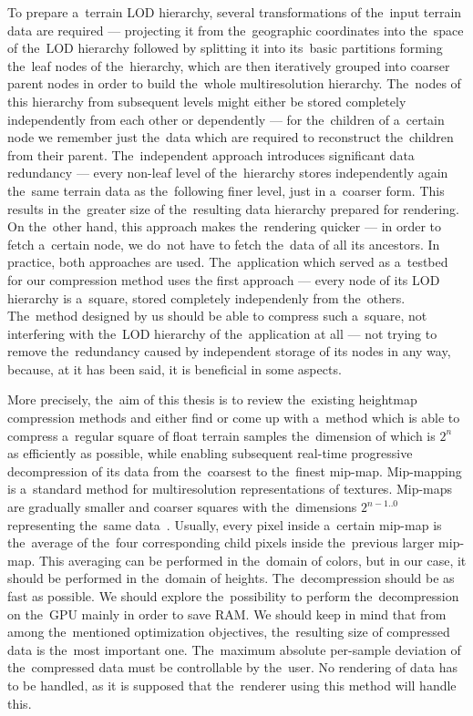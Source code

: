 To prepare a~terrain LOD hierarchy, several transformations of the~input terrain data are required --- projecting it from the~geographic coordinates into the~space of the~LOD hierarchy followed by splitting it into its~basic partitions forming the~leaf nodes of the~hierarchy, which are then iteratively grouped into coarser parent nodes in order to build the~whole multiresolution hierarchy. The~nodes of this hierarchy from subsequent levels might either be stored completely independently from each other or dependently --- for the~children of a~certain node we remember just the~data which are required to reconstruct the~children from their parent. The~independent approach introduces significant data redundancy --- every non-leaf level of the~hierarchy stores independently again the~same terrain data as the~following finer level, just in a~coarser form. This results in the~greater size of the~resulting data hierarchy prepared for rendering. On the~other hand, this approach makes the~rendering quicker --- in order to fetch a~certain node, we do~not have to fetch the~data of all its ancestors. In practice, both approaches are used. The~application which served as a~testbed for our compression method uses the first approach --- every node of its LOD hierarchy is a~square, stored completely independenly from the~others. The~method designed by us should be able to compress such a~square, not interfering with the~LOD hierarchy of the~application at all --- not trying to remove the~redundancy caused by independent storage of its nodes in any way, because, at it has been said, it is beneficial in some aspects.

More precisely, the~aim of this thesis is to review the~existing heightmap compression methods and either find or come up with a~method which is able to compress a~regular square of float terrain samples the~dimension of which is $2^n$ as efficiently as possible, while enabling subsequent real-time progressive decompression of its data from the~coarsest to the~finest mip-map. Mip-mapping is a~standard method for multiresolution representations of textures. Mip-maps are gradually smaller and coarser squares with the~dimensions $2^{n-1 .. 0}$ representing the~same data~\cite{basics}. Usually, every pixel inside a~certain mip-map is the~average of the~four corresponding child pixels inside the~previous larger mip-map. This averaging can be performed in the~domain of colors, but in our case, it should be performed in the~domain of heights. The~decompression should be as fast as possible. We should explore the~possibility to perform the~decompression on the~GPU mainly in order to save RAM. We should keep in mind that from among the~mentioned optimization objectives, the~resulting size of compressed data is the~most important one. The~maximum absolute per-sample deviation of the~compressed data must be controllable by the~user. No rendering of data has to be handled, as it is supposed that the~renderer using this method will handle this. 

